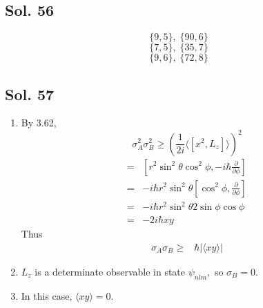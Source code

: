         \subsection*{Sol. 56}
        $$
        \{9, 5\},\;
        \{90, 6\}
        $$
        $$
        \{7, 5\},\;
        \{35, 7\}
        $$
        $$
        \{9, 6\},\;
        \{72, 8\}
        $$

        \subsection*{Sol. 57}
        \begin{enumerate}
            \item By 3.62,
            $$
            \sigma_A^2\sigma_B^2\geq 
            \left(
            \frac{1}{2i}
            \langle[x^2, L_z]\rangle
            \right)^2
            $$
            \begin{align*}
            [x^2, L_z]=&[r^2\sin^2\theta\cos^2\phi, -i\hbar\frac{\partial}{\partial\phi}]\\
            =&-i\hbar r^2\sin^2\theta[\cos^2\phi, \frac{\partial}{\partial\phi}]\\
            =&-i\hbar r^2\sin^2\theta2\sin\phi\cos\phi\\
            =&-2i\hbar xy
        \end{align*}
        Thus
        \begin{align*}
            \sigma_A\sigma_B\geq &
            \hbar
            |\langle
            xy
            \rangle|
        \end{align*}
        \item 
        $L_z$ is a determinate observable in state $\psi_{nlm},$ so $\sigma_B=0.$
        \item In this case, $\langle xy\rangle=0.$
        \end{enumerate}

